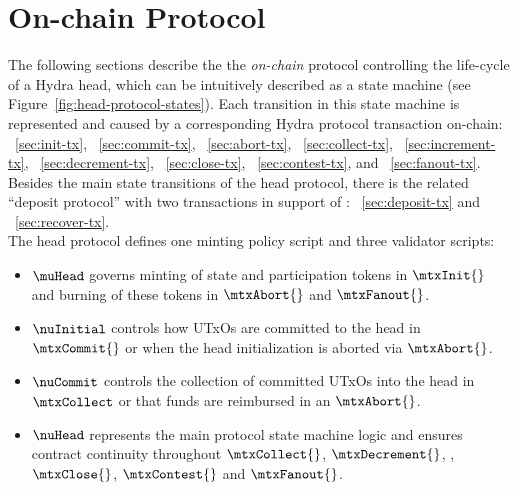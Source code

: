 \clearpage
\section{On-chain Protocol}\label{sec:on-chain}


\noindent The following sections describe the the \emph{on-chain} protocol
controlling the life-cycle of a Hydra head, which can be intuitively described
as a state machine (see Figure~\ref{fig:head-protocol-states}). Each transition
in this state machine is represented and caused by a corresponding Hydra
protocol transaction
on-chain: \mtxInit{}~\ref{sec:init-tx}, \mtxCom{}~\ref{sec:commit-tx}, \mtxAbort{}~\ref{sec:abort-tx}, \mtxCollect{}~\ref{sec:collect-tx}, \mtxIncrement{}~\ref{sec:increment-tx}, \mtxDecrement{}~\ref{sec:decrement-tx}, \mtxClose{}~\ref{sec:close-tx}, \mtxContest{}~\ref{sec:contest-tx}, and \mtxFanout{}~\ref{sec:fanout-tx}. \\

\noindent Besides the main state transitions of the head protocol, there is
  the related ``deposit protocol'' with two transactions in support of
  \mtxIncrement{}: \mtxDeposit{}~\ref{sec:deposit-tx} and \mtxRecover{}~\ref{sec:recover-tx}. \\


\noindent The head protocol defines one minting policy script and three
validator scripts:
\begin{itemize}
  \item $\muHead$ governs minting of state and participation tokens in
  $\mtxInit{}$ and burning of these tokens in $\mtxAbort{}$ and
  $\mtxFanout{}$.
  \item $\nuInitial$ controls how UTxOs are committed to the head in
  $\mtxCommit{}$ or when the head initialization is aborted via
  $\mtxAbort{}$.
  \item $\nuCommit$ controls the collection of committed UTxOs into the head in
  $\mtxCollect$ or that funds are reimbursed in an $\mtxAbort{}$.
  \item $\nuHead$ represents the main protocol state machine logic and ensures
  contract continuity throughout $\mtxCollect{}$, $\mtxDecrement{}$,
  \mtxIncrement{}, $\mtxClose{}$, $\mtxContest{}$ and
  $\mtxFanout{}$.
\end{itemize}

